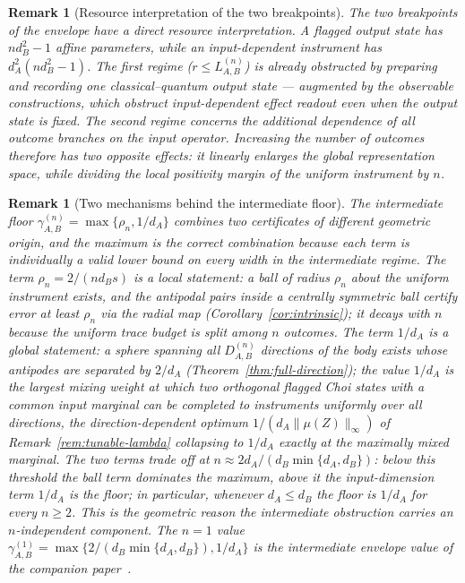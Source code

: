 \documentclass[11pt,a4paper]{article}
\newtheorem{remark}[theorem]{Remark}
\begin{document}
\begin{remark}[Resource interpretation of the two breakpoints]
\label{rem:breakpoints}
The two breakpoints of the envelope have a direct resource interpretation. A flagged output state has $nd_B^2-1$ affine parameters, while an input-dependent instrument has $d_A^2(nd_B^2-1)$. The first regime ($r\le L_{A,B}^{(n)}$) is already obstructed by preparing and recording one classical--quantum output state --- augmented by the observable constructions, which obstruct input-dependent effect readout even when the output state is fixed. The second regime concerns the additional dependence of all outcome branches on the input operator. Increasing the number of outcomes therefore has two opposite effects: it linearly enlarges the global representation space, while dividing the local positivity margin of the uniform instrument by $n$.
\end{remark}

\begin{remark}[Two mechanisms behind the intermediate floor]
\label{rem:gamma-mechanisms}
The intermediate floor $\gamma_{A,B}^{(n)}=\max\{\rho_n,1/d_A\}$ combines two certificates of different geometric origin, and the maximum is the correct combination because each term is individually a valid lower bound on every width in the intermediate regime. The term $\rho_n=2/(nd_Bs)$ is a local statement: a ball of radius $\rho_n$ about the uniform instrument exists, and the antipodal pairs inside a centrally symmetric ball certify error at least $\rho_n$ via the radial map (Corollary~\ref{cor:intrinsic}); it decays with $n$ because the uniform trace budget is split among $n$ outcomes. The term $1/d_A$ is a global statement: a sphere spanning all $D_{A,B}^{(n)}$ directions of the body exists whose antipodes are separated by $2/d_A$ (Theorem~\ref{thm:full-direction}); the value $1/d_A$ is the largest mixing weight at which two orthogonal flagged Choi states with a common input marginal can be completed to instruments uniformly over all directions, the direction-dependent optimum $1/(d_A\|\mu(Z)\|_\infty)$ of Remark~\ref{rem:tunable-lambda} collapsing to $1/d_A$ exactly at the maximally mixed marginal. The two terms trade off at $n\approx2d_A/(d_B\min\{d_A,d_B\})$: below this threshold the ball term dominates the maximum, above it the input-dimension term $1/d_A$ is the floor; in particular, whenever $d_A\le d_B$ the floor is $1/d_A$ for every $n\ge2$. This is the geometric reason the intermediate obstruction carries an $n$-independent component. The $n=1$ value $\gamma_{A,B}^{(1)}=\max\{2/(d_B\min\{d_A,d_B\}),1/d_A\}$ is the intermediate envelope value of the companion paper~\cite{CompanionChannels}.
\end{remark}
\end{document}
